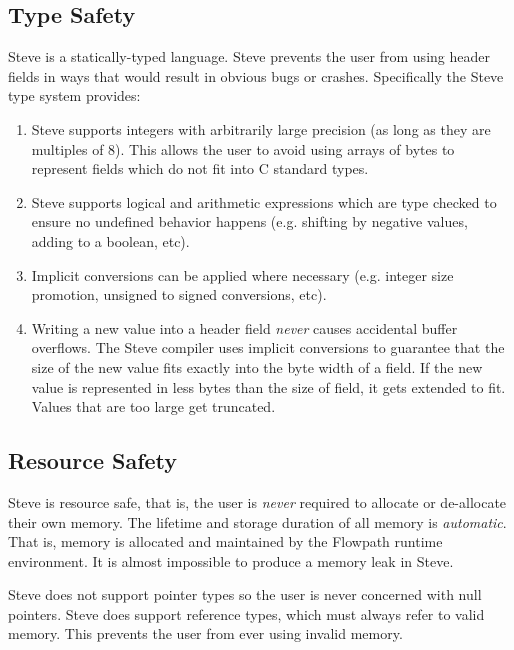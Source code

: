 \subsection{Type Safety}

Steve is a statically-typed language. Steve prevents the user from using header fields in ways that would result in obvious bugs or crashes. Specifically the Steve type system provides:

\begin{enumerate}
\item Steve supports integers with arbitrarily large precision (as long as they are multiples of 8). This allows the user to avoid using arrays of bytes to represent fields which do not fit into C standard types.

\item Steve supports logical and arithmetic expressions which are type checked to ensure no undefined behavior happens (e.g. shifting by negative values, adding to a boolean, etc). 

\item Implicit conversions can be applied where necessary (e.g. integer size promotion, unsigned to signed conversions, etc).

\item Writing a new value into a header field \textit{never} causes accidental buffer overflows. The Steve compiler uses implicit conversions to guarantee that the size of the new value fits exactly into the byte width of a field. If the new value is represented in less bytes than the size of field, it gets extended to fit. Values that are too large get truncated.
\end{enumerate}

\subsection{Resource Safety}

Steve is resource safe, that is, the user is \emph{never} required to allocate or de-allocate their own memory. The lifetime and storage duration of all memory is \textit{automatic}. That is, memory is allocated and maintained by the Flowpath runtime environment. It is almost impossible to produce a memory leak in Steve.

Steve does not support pointer types so the user is never concerned with null pointers. Steve does support reference types, which must always refer to valid memory. This prevents the user from ever using invalid memory.

